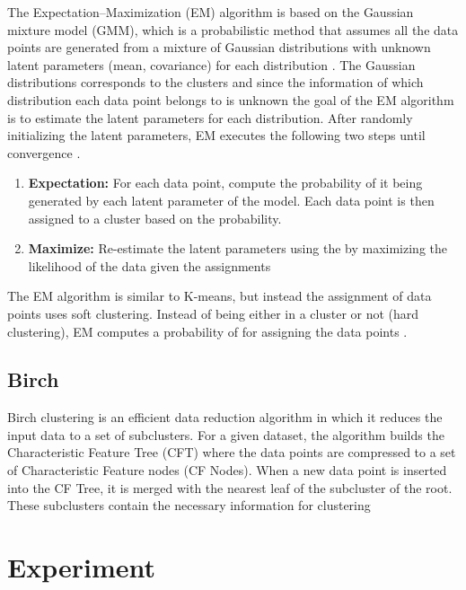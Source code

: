 \documentclass[12pt,english]{article}
\begin{document}
The Expectation–Maximization (EM) algorithm is based on the Gaussian mixture model (GMM), which is a probabilistic method that assumes all the data points are generated from a mixture of Gaussian distributions with unknown latent parameters (mean, covariance) for each distribution \cite{scikit-learn}. The Gaussian distributions corresponds to the clusters and since the information of which distribution each data point belongs to is unknown the goal of the EM algorithm is to estimate the latent parameters for each distribution. After randomly initializing the latent parameters, EM executes the following two steps until convergence \cite{scikit-learn}.

\begin{enumerate}
\item \textbf{Expectation: } For each data point, compute the probability of it being generated by each latent parameter of the model. Each data point is then assigned to a cluster based on the probability.

\item \textbf{Maximize: } Re-estimate the latent parameters using the by maximizing the likelihood of the data given the assignments 

\end{enumerate}

The EM algorithm is similar to K-means, but instead the assignment of data points uses soft clustering. Instead of being either in a cluster or not (hard clustering), EM computes a probability of for assigning the data points \cite{ncbi}.

\subsection{Birch}

\quad
Birch clustering is an efficient data reduction algorithm in which it reduces the input data to a set of subclusters. For a given dataset, the algorithm builds the Characteristic Feature Tree (CFT) where the data points are compressed to a set of  Characteristic Feature nodes (CF Nodes). When a new data point is inserted into the CF Tree, it is merged with the nearest leaf of the subcluster of the root. These subclusters contain the necessary information for clustering \cite{scikit-learn}

\section{Experiment}
\end{document}
